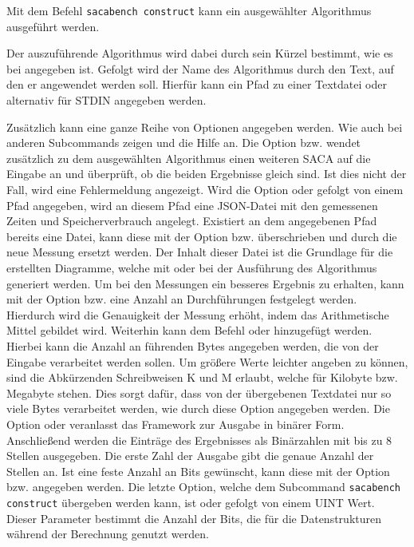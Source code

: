 {Mit dem Befehl \texttt{sacabench construct} kann ein ausgewählter Algorithmus ausgeführt werden. 
\par
Der auszuf{\"u}hrende Algorithmus wird dabei durch sein K{\"u}rzel bestimmt, wie es bei  angegeben ist. 
Gefolgt wird der Name des Algorithmus durch den Text, auf den er angewendet werden soll. 
Hierf{\"u}r kann ein Pfad zu einer Textdatei oder alternativ \termfont{-} f{\"u}r STDIN angegeben werden. 
\par
Zus{\"a}tzlich kann eine ganze Reihe von Optionen angegeben werden. 
Wie auch bei anderen Subcommands zeigen  und  die Hilfe an. 
Die Option  bzw.  wendet zus{\"a}tzlich zu dem ausgew{\"a}hlten Algorithmus einen weiteren SACA auf die Eingabe an und {\"u}berpr{\"u}ft, ob die beiden Ergebnisse gleich sind. 
Ist dies nicht der Fall, wird eine Fehlermeldung angezeigt. 
Wird die Option  oder  gefolgt von einem Pfad angegeben, wird an diesem Pfad eine JSON-Datei mit den gemessenen Zeiten und Speicherverbrauch angelegt. 
Existiert an dem angegebenen Pfad bereits eine Datei, kann diese mit der Option  bzw.  {\"u}berschrieben und durch die neue Messung ersetzt werden. 
Der Inhalt dieser Datei ist die Grundlage f{\"u}r die erstellten Diagramme, welche mit  oder  bei der Ausf{\"u}hrung des Algorithmus generiert werden. 
Um bei den Messungen ein besseres Ergebnis zu erhalten, kann mit der Option  bzw.  eine Anzahl an Durchf{\"u}hrungen festgelegt werden. 
Hierdurch wird die Genauigkeit der Messung erh{\"o}ht, indem das Arithmetische Mittel gebildet wird.
Weiterhin kann dem Befehl  oder  hinzugef{\"u}gt werden. 
Hierbei kann die Anzahl an f{\"u}hrenden Bytes angegeben werden, die von der Eingabe verarbeitet werden sollen.
Um gr{\"o}{\ss}ere Werte leichter angeben zu k{\"o}nnen, sind die Abk{\"u}rzenden Schreibweisen K und M erlaubt, welche f{\"u}r Kilobyte bzw. Megabyte stehen.
Dies sorgt daf{\"u}r, dass von der {\"u}bergebenen Textdatei nur so viele Bytes verarbeitet werden, wie durch diese Option angegeben werden. 
Die Option  oder  veranlasst das Framework zur Ausgabe in bin{\"a}rer Form.
Anschlie{\ss}end werden die Eintr{\"a}ge des Ergebnisses als Bin{\"a}rzahlen mit bis zu 8 Stellen ausgegeben. 
Die erste Zahl der Ausgabe gibt die genaue Anzahl der Stellen an.
Ist eine feste Anzahl an Bits gew{\"u}nscht, kann diese mit der Option  bzw.  angegeben werden.
Die letzte Option, welche dem Subcommand \texttt{sacabench construct} {\"u}bergeben werden kann, ist  oder  gefolgt von einem UINT Wert. Dieser Parameter bestimmt die Anzahl der Bits, die f{\"u}r die Datenstrukturen w{\"a}hrend der Berechnung genutzt werden.
\par
}

